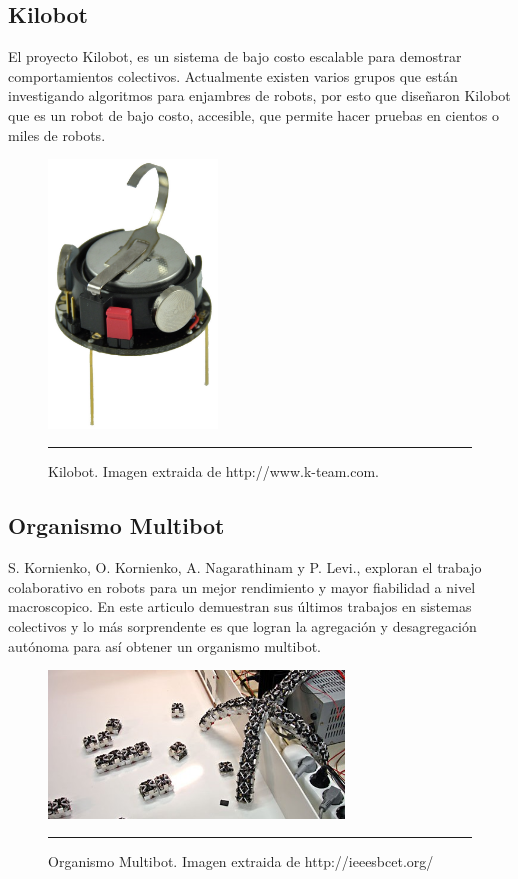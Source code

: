 \subsection{Kilobot}
El proyecto Kilobot, es un sistema de bajo costo escalable para demostrar comportamientos colectivos. Actualmente existen varios grupos que están investigando algoritmos para enjambres de robots, por esto que diseñaron Kilobot que es un robot de bajo costo, accesible,  que permite hacer pruebas en cientos o miles de robots.

\begin{figure}[htbp]
	\centering
		\includegraphics[width=0.4\textwidth]{./Figures/kilobot.jpg}
		\rule{35em}{0.5pt}
	\caption[swarm]{Kilobot. Imagen extraida de http://www.k-team.com.}
	\label{fig:kilobot}
\end{figure}




\subsection{Organismo Multibot}

S. Kornienko, O. Kornienko, A. Nagarathinam y P. Levi., exploran el trabajo colaborativo en robots para un mejor rendimiento y mayor fiabilidad a nivel macroscopico. En este articulo demuestran sus últimos trabajos en sistemas colectivos y lo más sorprendente es que logran la agregación y desagregación autónoma para así obtener un organismo multibot.
\cite{5359578}

\begin{figure}[htbp]
	\centering
		\includegraphics[width=0.7\textwidth]{./Figures/Multibot_organism.jpg}
		\rule{35em}{0.5pt}
	\caption[swarm]{Organismo Multibot. Imagen extraida de http://ieeesbcet.org/}
	\label{fig:Organismo}
\end{figure}


